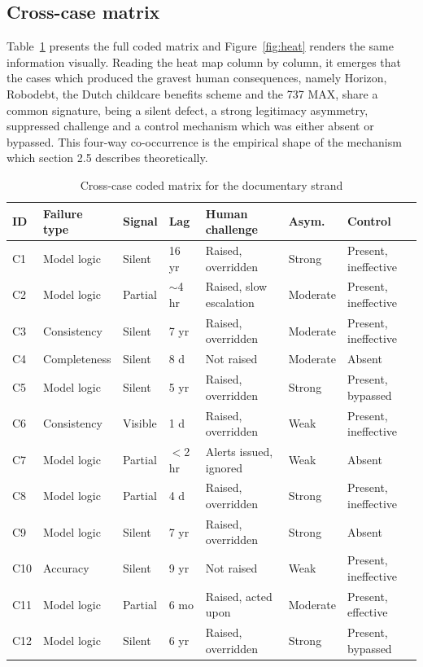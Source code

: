 \documentclass[12pt,a4paper]{article}
\begin{document}
\subsection{Cross-case matrix}

Table~\ref{tab:coded} presents the full coded matrix and Figure~\ref{fig:heat} renders the same information
visually. Reading the heat map column by column, it emerges that the cases which produced the gravest human
consequences, namely Horizon, Robodebt, the Dutch childcare benefits scheme and the 737 MAX, share a common
signature, being a silent defect, a strong legitimacy asymmetry, suppressed challenge and a control
mechanism which was either absent or bypassed. This four-way co-occurrence is the empirical shape of the
mechanism which section 2.5 describes theoretically.

\begin{table}[H]
\centering\footnotesize
\caption{Cross-case coded matrix for the documentary strand}
\label{tab:coded}
\begin{tabularx}{\textwidth}{@{}p{0.7cm} p{1.9cm} p{1.4cm} p{1.2cm} X p{1.5cm} p{2.4cm}@{}}
\toprule
\textbf{ID} & \textbf{Failure type} & \textbf{Signal} & \textbf{Lag} & \textbf{Human challenge} &
\textbf{Asym.} & \textbf{Control} \\
\midrule
C1 & Model logic & Silent & 16 yr & Raised, overridden & Strong & Present, ineffective \\
C2 & Model logic & Partial & $\sim$4 hr & Raised, slow escalation & Moderate & Present, ineffective \\
C3 & Consistency & Silent & 7 yr & Raised, overridden & Moderate & Present, ineffective \\
C4 & Completeness & Silent & 8 d & Not raised & Moderate & Absent \\
C5 & Model logic & Silent & 5 yr & Raised, overridden & Strong & Present, bypassed \\
C6 & Consistency & Visible & 1 d & Raised, overridden & Weak & Present, ineffective \\
C7 & Model logic & Partial & $<$2 hr & Alerts issued, ignored & Weak & Absent \\
C8 & Model logic & Partial & 4 d & Raised, overridden & Strong & Present, ineffective \\
C9 & Model logic & Silent & 7 yr & Raised, overridden & Strong & Absent \\
C10 & Accuracy & Silent & 9 yr & Not raised & Weak & Present, ineffective \\
C11 & Model logic & Partial & 6 mo & Raised, acted upon & Moderate & Present, effective \\
C12 & Model logic & Silent & 6 yr & Raised, overridden & Strong & Present, bypassed \\
\bottomrule
\end{tabularx}
\end{table}
\end{document}

